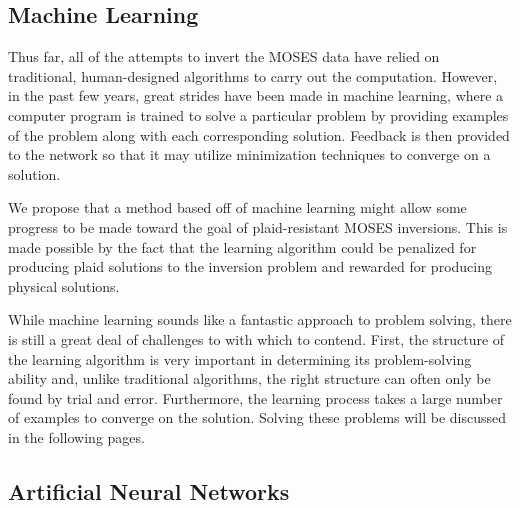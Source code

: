\documentclass[twoside]{article}
\begin{document}
\begin{multicols}{2}
\subsection{Machine Learning}
Thus far, all of the attempts to invert the MOSES data have relied on traditional, human-designed algorithms to carry out the computation. However, in the past few years, great strides have been made in machine learning, where a computer program is trained to solve a particular problem by providing examples of the problem along with each corresponding solution. Feedback is then provided to the network so that it may utilize minimization techniques to converge on a solution. \par We propose that a method based off of machine learning might allow some progress to be made toward the goal of plaid-resistant MOSES inversions. This is made possible by the fact that the learning algorithm could be penalized for producing plaid solutions to the inversion problem and rewarded for producing physical solutions.  \par While machine learning sounds like a fantastic approach to problem solving, there is still a great deal of challenges to with which to contend. First, the structure of the learning algorithm is very important in determining its problem-solving ability and, unlike traditional algorithms, the right structure can often only be found by trial and error. Furthermore, the learning process takes a large number of examples to converge on the solution. Solving these problems will be discussed in the following pages.

\subsection{Artificial Neural Networks}


\end{multicols}
\end{document}
